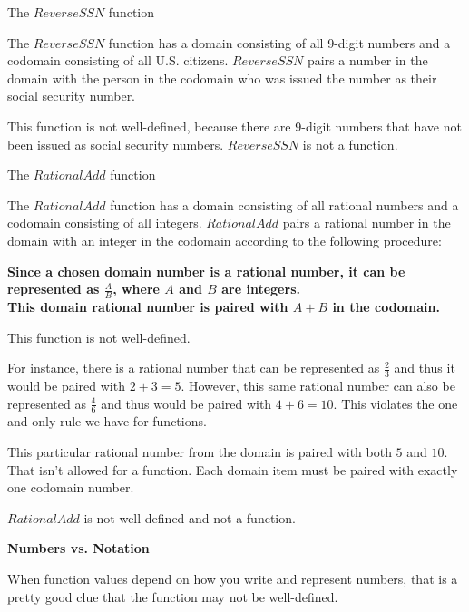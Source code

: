\documentclass{ximera}
\begin{document}
\begin{example} The $ReverseSSN$ function

The $ReverseSSN$ function has a domain consisting of all 9-digit numbers and a codomain consisting of all U.S. citizens.  $ReverseSSN$ pairs a number in the domain with the person in the codomain who was issued the number as their social security number. 


This function is not well-defined, because there are 9-digit numbers that have not been issued as social security numbers.  $ReverseSSN$ is not a function.
\end{example}


\begin{example} The $RationalAdd$ function

The $RationalAdd$ function has a domain consisting of all rational numbers and a codomain consisting of all integers.  $RationalAdd$ pairs a rational number in the domain with an integer in the codomain according to the following procedure: 

\begin{center}
\textbf{\textcolor{blue!55!black}{Since a chosen domain number is a rational number, it can be represented as $\tfrac{A}{B}$, where $A$ and $B$ are integers. \\This domain rational number is paired with $A+B$ in the codomain.}}
\end{center}

This function is not well-defined.  

For instance, there is a rational number that can be represented as $\tfrac{2}{3}$ and thus it would be paired with $2 + 3 = 5$.  However, this same rational number can also be represented as $\tfrac{4}{6}$ and thus would be paired with $4 + 6 = 10$.  This violates the one and only rule we have for functions.  


This particular rational number from the domain is paired with both $5$ and $10$. That isn't allowed for a function. Each domain item must be paired with exactly one codomain number. 

$RationalAdd$ is not well-defined and not a function.

\end{example}



\begin{warning} \textbf{\textcolor{red!70!black}{Numbers vs. Notation}}

When function values depend on how you write and represent numbers, that is a pretty good clue that the function may not be well-defined.
\end{warning}
\end{document}
